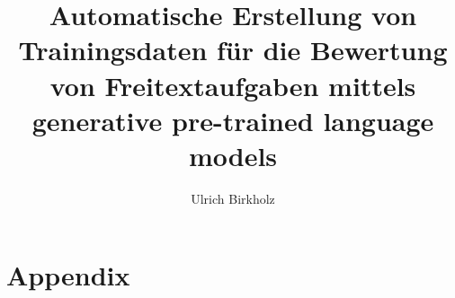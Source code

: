 \documentclass[
11pt,
titlepage,
a4paper,
abstracton,
twoside,
openright,
chapterprefix,
noappendixprefix,
headsepline,
footsepline,
cleardoubleplain,
bibtotoc,
liststotoc,
pointlessnumbers
]{scrreprt}
\begin{document}
\title{Automatische Erstellung von Trainingsdaten für die Bewertung von Freitextaufgaben mittels generative pre-trained language models}
\author{Ulrich Birkholz}

\maketitle

\cleardoublepage
\pagestyle{empty}

\pagestyle{empty}


\setcounter{page}{2}
\begin{abstract}
\thispagestyle{plain}

\end{abstract}

\pagestyle{scrheadings}
\setcounter{tocdepth}{2}
\tableofcontents

\cleardoublepage
{}
\pagestyle{scrheadings}
\sloppy










\cleardoublepage
{}
\part*{Appendix}
\begin{appendix}

\end{appendix}

\cleardoublepage
\listoffigures
\listoftables


\end{document}
